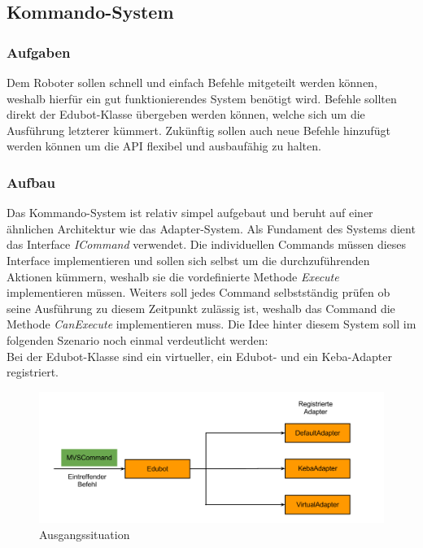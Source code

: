 
\subsection{Kommando-System}

\subsubsection{Aufgaben}
Dem Roboter sollen schnell und einfach Befehle mitgeteilt werden können, weshalb hierfür ein gut funktionierendes System benötigt wird. Befehle sollten direkt der Edubot-Klasse übergeben werden können, welche sich um die Ausführung letzterer kümmert. Zukünftig sollen auch neue Befehle hinzufügt werden können um die API flexibel und ausbaufähig zu halten.

\subsubsection{Aufbau}
Das Kommando-System ist relativ simpel aufgebaut und beruht auf einer ähnlichen Architektur wie das Adapter-System. Als Fundament des Systems dient das Interface \textit{ICommand} verwendet. Die individuellen Commands müssen dieses Interface implementieren und sollen sich selbst um die durchzuführenden Aktionen kümmern, weshalb sie die vordefinierte Methode \textit{Execute} implementieren müssen. Weiters soll jedes Command selbstständig prüfen ob seine Ausführung zu diesem Zeitpunkt zulässig ist, weshalb das Command die Methode \textit{CanExecute} implementieren muss.
Die Idee hinter diesem System soll im folgenden Szenario noch einmal verdeutlicht werden:\\
Bei der Edubot-Klasse sind ein virtueller, ein Edubot- und ein Keba-Adapter registriert.
\begin{figure}[H]
  \centering
  \begin{minipage}[t]{12 cm}
  	\centering
  	\includegraphics[width=12cm]{images/CommandSystem1} 
    \caption{Ausgangssituation}
  \end{minipage}
\end{figure}
